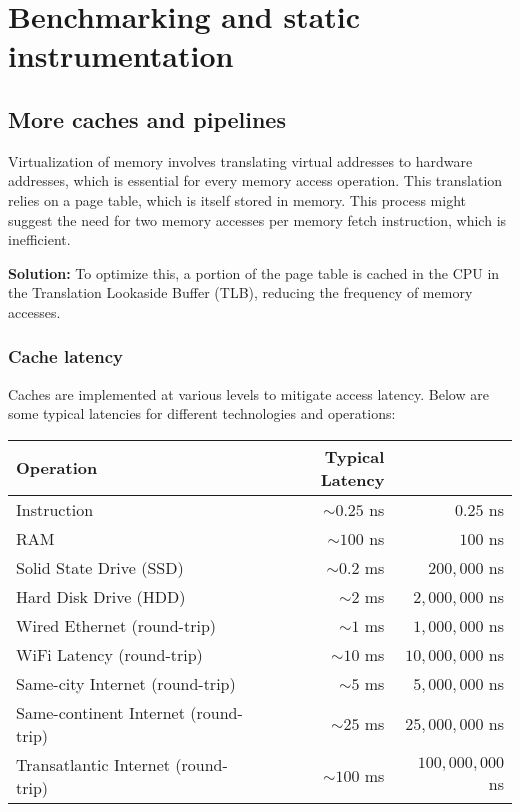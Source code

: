 \documentclass[12pt]{article}
\begin{document}
\newpage
\section{Benchmarking and static instrumentation}

\subsection{More caches and pipelines}
Virtualization of memory involves translating virtual addresses to hardware addresses, which is essential for every memory access operation. This translation relies on a page table, which is itself stored in memory. This process might suggest the need for two memory accesses per memory fetch instruction, which is inefficient.

\textbf{Solution:} To optimize this, a portion of the page table is cached in the CPU in the Translation Lookaside Buffer (TLB), reducing the frequency of memory accesses.

\subsubsection{Cache latency}
Caches are implemented at various levels to mitigate access latency. Below are some typical latencies for different technologies and operations:


\begin{table}[h]
\centering
\begin{tabular}{lrr}
\toprule
\textbf{Operation} & \textbf{Typical Latency} & \\
\midrule
Instruction & $\sim0.25$ ns & $0.25$ ns \\
RAM & $\sim100$ ns & $100$ ns \\
Solid State Drive (SSD) & $\sim0.2$ ms & $200,000$ ns \\
Hard Disk Drive (HDD) & $\sim2$ ms & $2,000,000$ ns \\
Wired Ethernet (round-trip) & $\sim1$ ms & $1,000,000$ ns \\
WiFi Latency (round-trip) & $\sim10$ ms & $10,000,000$ ns \\
Same-city Internet (round-trip) & $\sim5$ ms & $5,000,000$ ns \\
Same-continent Internet (round-trip) & $\sim25$ ms & $25,000,000$ ns \\
Transatlantic Internet (round-trip) & $\sim100$ ms & $100,000,000$ ns \\
\bottomrule
\end{tabular}
\end{table}
\end{document}
